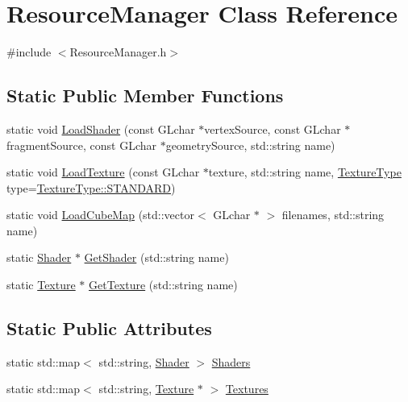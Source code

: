\hypertarget{class_resource_manager}{}\section{Resource\+Manager Class Reference}
\label{class_resource_manager}


{\ttfamily \#include $<$Resource\+Manager.\+h$>$}

\subsection*{Static Public Member Functions}
\begin{DoxyCompactItemize}
\item 
static void \mbox{\hyperlink{class_resource_manager_a00f5f597ddb23cfc50f5215e0768a336}{Load\+Shader}} (const G\+Lchar $\ast$vertex\+Source, const G\+Lchar $\ast$fragment\+Source, const G\+Lchar $\ast$geometry\+Source, std\+::string name)
\item 
static void \mbox{\hyperlink{class_resource_manager_abe39b263c98ff63a9ce991b171356982}{Load\+Texture}} (const G\+Lchar $\ast$texture, std\+::string name, \mbox{\hyperlink{_texture_8h_a65468556d79304b3a4bfc464cc12e549}{Texture\+Type}} type=\mbox{\hyperlink{_texture_8h_a65468556d79304b3a4bfc464cc12e549a94e94133f4bdc1794c6b647b8ea134d0}{Texture\+Type\+::\+S\+T\+A\+N\+D\+A\+RD}})
\item 
static void \mbox{\hyperlink{class_resource_manager_aa1b2f4a63ed096bbcd1e3732078f35f6}{Load\+Cube\+Map}} (std\+::vector$<$ G\+Lchar $\ast$ $>$ filenames, std\+::string name)
\item 
static \mbox{\hyperlink{class_shader}{Shader}} $\ast$ \mbox{\hyperlink{class_resource_manager_ae95ecdc6de1127616485f7d069437332}{Get\+Shader}} (std\+::string name)
\item 
static \mbox{\hyperlink{class_texture}{Texture}} $\ast$ \mbox{\hyperlink{class_resource_manager_aa1456969a733c58bc47f372005699cbc}{Get\+Texture}} (std\+::string name)
\end{DoxyCompactItemize}
\subsection*{Static Public Attributes}
\begin{DoxyCompactItemize}
\item 
static std\+::map$<$ std\+::string, \mbox{\hyperlink{class_shader}{Shader}} $>$ \mbox{\hyperlink{class_resource_manager_a8c1bc8fe6e0f92ab3c7e2dca94b0e491}{Shaders}}
\item 
static std\+::map$<$ std\+::string, \mbox{\hyperlink{class_texture}{Texture}} $\ast$ $>$ \mbox{\hyperlink{class_resource_manager_a43a756e8e9ce85e0cf25946205749a9f}{Textures}}
\end{DoxyCompactItemize}


